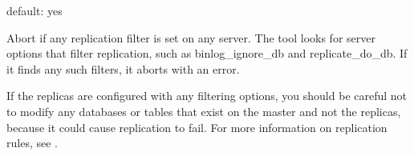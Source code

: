 \documentclass[letterpaper,10pt,english]{sphinxmanual}
\begin{document}

\begin{fulllineitems}
\label{\detokenize{mariadb-schema-change:cmdoption-mariadb-schema-change-no-check-replication-filters}}
\sphinxAtStartPar
default: yes

\sphinxAtStartPar
Abort if any replication filter is set on any server.  The tool looks for
server options that filter replication, such as binlog\_ignore\_db and
replicate\_do\_db.  If it finds any such filters, it aborts with an error.

\sphinxAtStartPar
If the replicas are configured with any filtering options, you should be careful
not to modify any databases or tables that exist on the master and not the
replicas, because it could cause replication to fail.  For more information on
replication rules, see .

\end{fulllineitems}

\end{document}

